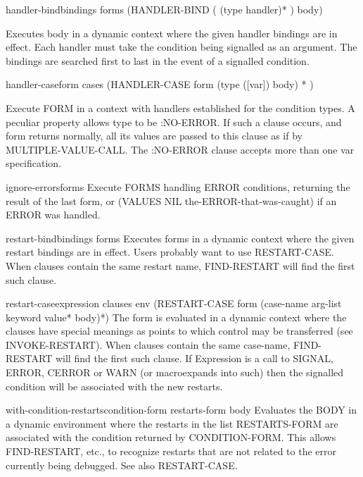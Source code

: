 \documentclass[10pt,english]{book}
\begin{document}
\begin{macro}{handler-bind}{bindings \body forms}
  (HANDLER-BIND ( {(type handler)}* )  body)

Executes body in a dynamic context where the given handler bindings are in
effect. Each handler must take the condition being signalled as an argument.
The bindings are searched first to last in the event of a signalled
condition.
\end{macro}

\begin{macro}{handler-case}{form \rest cases}
  (HANDLER-CASE form { (type ([var]) body) }* )

Execute FORM in a context with handlers established for the condition types. A
peculiar property allows type to be :NO-ERROR. If such a clause occurs, and
form returns normally, all its values are passed to this clause as if by
MULTIPLE-VALUE-CALL. The :NO-ERROR clause accepts more than one var
specification.
\end{macro}

\begin{macro}{ignore-errors}{\rest forms}
  Execute FORMS handling ERROR conditions, returning the result of the last
  form, or (VALUES NIL the-ERROR-that-was-caught) if an ERROR was handled.
\end{macro}

\begin{macro}{restart-bind}{bindings \body forms}
  Executes forms in a dynamic context where the given restart bindings are
   in effect. Users probably want to use RESTART-CASE. When clauses contain
   the same restart name, FIND-RESTART will find the first such clause.
\end{macro}

\begin{macro}{restart-case}{expression \body clauses \env env}
  (RESTART-CASE form
   {(case-name arg-list {keyword value}* body)}*)
   The form is evaluated in a dynamic context where the clauses have special
   meanings as points to which control may be transferred (see INVOKE-RESTART).
   When clauses contain the same case-name, FIND-RESTART will find the first
   such clause. If Expression is a call to SIGNAL, ERROR, CERROR or WARN (or
   macroexpands into such) then the signalled condition will be associated with
   the new restarts.
\end{macro}

\begin{macro}{with-condition-restarts}{condition-form restarts-form \body body}
  Evaluates the BODY in a dynamic environment where the restarts in the list
   RESTARTS-FORM are associated with the condition returned by CONDITION-FORM.
   This allows FIND-RESTART, etc., to recognize restarts that are not related
   to the error currently being debugged. See also RESTART-CASE.
\end{macro}
\end{document}
